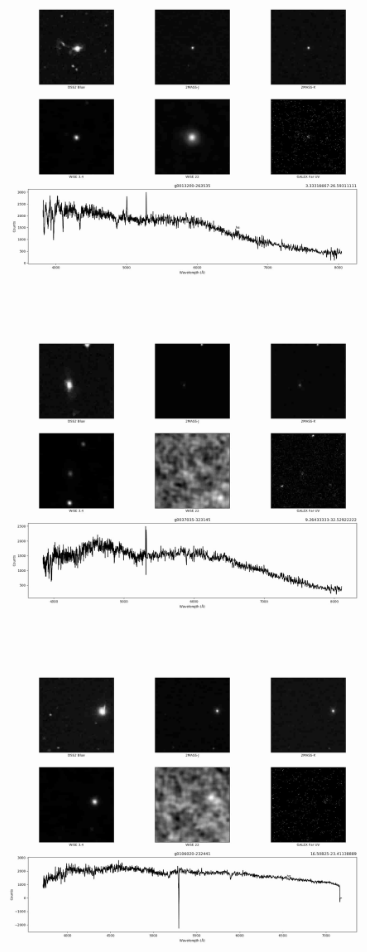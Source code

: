 \begin{figure}[H]
\begin{center}
        \includegraphics[scale = 0.10]{figuras/3.jpg}
        \includegraphics[scale = 0.10]{figuras/4.jpg}
        \includegraphics[scale = 0.10]{figuras/5.jpg}

\end{center}
\end{figure}
